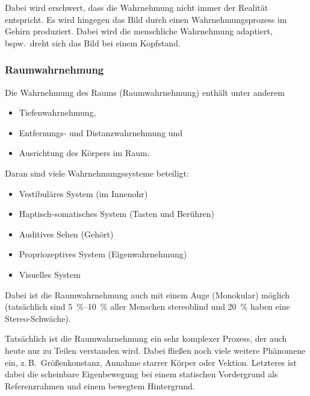 \documentclass[a4paper, 11pt, accentcolor = tud3b]{tudreport}
\newcommand{\bspw}{bspw.~}
\newcommand{\zB}{z.\,B.~}
\begin{document}
				Dabei wird erschwert, dass die Wahrnehmung nicht immer der Realität entspricht. Es wird hingegen das Bild durch einen Wahrnehmungsprozess im Gehirn produziert. Dabei wird die menschliche Wahrnehmung adaptiert, \bspw dreht sich das Bild bei einem Kopfstand.

				\subsubsection{Raumwahrnehmung}
					Die Wahrnehmung des Raums (Raumwahrnehmung) enthält unter anderem
					\begin{itemize}
						\item Tiefenwahrnehmung,
						\item Entfernungs- und Distanzwahrnehmung und
						\item Ausrichtung des Körpers im Raum.
					\end{itemize}
					Daran sind viele Wahrnehmungssysteme beteiligt:
					\begin{itemize}
						\item Vestibuläres System (im Innenohr)
						\item Haptisch-somatisches System (Tasten und Berühren)
						\item Auditives Sehen (Gehört)
						\item Propriozeptives System (Eigenwahrnehmung)
						\item Visuelles System
					\end{itemize}
				
					Dabei ist die Raumwahrnehmung auch mit einem Auge (Monokular) möglich (tatsächlich sind \SIrange{5}{10}{\percent} aller Menschen stereoblind und \SI{20}{\percent} haben eine Stereo-Schwäche).
					
					Tatsächlich ist die Raumwahrnehmung ein sehr komplexer Prozess, der auch heute nur zu Teilen verstanden wird. Dabei fließen noch viele weitere Phänomene ein, \zB Größenkonstanz, Annahme starrer Körper oder Vektion. Letzteres ist dabei die scheinbare Eigenbewegung bei einem statischen Vordergrund als Referenzrahmen und einem bewegtem Hintergrund.
\end{document}
